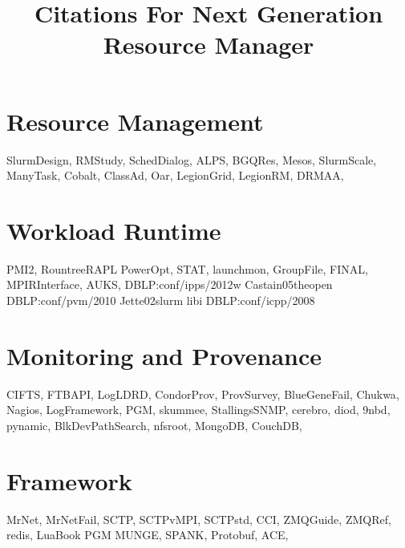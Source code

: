 \documentclass{article}
\newcommand{\ngrmfull}{Next Generation Resource Manager}
\begin{document}
\title{Citations For \ngrmfull}
\maketitle

\section{Resource Management}

SlurmDesign\cite{SlurmDesign},
RMStudy\cite{RMStudy},
SchedDialog\cite{SchedDialog},
ALPS\cite{ALPS},
BGQRes\cite{BGQRes},
Mesos\cite{Mesos},
SlurmScale\cite{SlurmScale},
ManyTask\cite{ManyTask},
Cobalt\cite{Cobalt},
ClassAd\cite{ClassAd},
Oar\cite{Oar},
LegionGrid\cite{LegionGrid},
LegionRM\cite{LegionRM},
DRMAA\cite{DRMAA},

\section{Workload Runtime}

PMI2\cite{PMI2},
RountreeRAPL\cite{RountreeRAPL}
PowerOpt\cite{PowerOpt},
STAT\cite{STAT},
launchmon\cite{launchmon},
GroupFile\cite{GroupFile},
FINAL\cite{FINAL},
MPIRInterface\cite{MPIRInterface},
AUKS\cite{AUKS},
DBLP:conf/ipps/2012w\cite{DBLP:conf/ipps/2012w}
Castain05theopen\cite{Castain05theopen}
DBLP:conf/pvm/2010\cite{DBLP:conf/pvm/2010}
Jette02slurm\cite{Jette02slurm}
libi\cite{libi}
DBLP:conf/icpp/2008\cite{DBLP:conf/icpp/2008}

\section{Monitoring and Provenance}

CIFTS\cite{CIFTS},
FTBAPI\cite{FTBAPI},
LogLDRD\cite{LogLDRD},
CondorProv\cite{CondorProv},
ProvSurvey\cite{ProvSurvey},
BlueGeneFail\cite{BlueGeneFail},
Chukwa\cite{Chukwa},
Nagios\cite{Nagios},
LogFramework\cite{LogFramework},
PGM\cite{rfc3208},
skummee\cite{skummee},
StallingsSNMP\cite{StallingsSNMP},
cerebro\cite{cerebro},
diod\cite{diod},
9nbd\cite{9nbd},
pynamic\cite{pynamic},
BlkDevPathSearch\cite{BlkDevPathSearch},
nfsroot\cite{nfsroot},
MongoDB\cite{MongoDB},
CouchDB\cite{CouchDB},

\section{Framework}

MrNet\cite{MrNet},
MrNetFail\cite{MrNetFail},
SCTP\cite{SCTP},
SCTPvMPI\cite{SCTPvMPI},
SCTPstd\cite{SCTPstd},
CCI\cite{CCI},
ZMQGuide\cite{ZMQGuide},
ZMQRef\cite{ZMQRef},
redis\cite{redis},
LuaBook\cite{LuaBook}
PGM\cite{rfc3208}
MUNGE\cite{munge},
SPANK\cite{SPANK},
Protobuf\cite{Protobuf},
ACE\cite{ACE},



\end{document}
